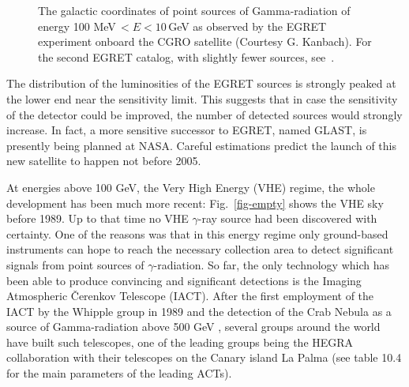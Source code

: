 \begin{figure}[h]
\begin{center}
\caption{\label{fig-egret3rdcat}
The galactic coordinates of point sources of Gamma-radiation of energy
100 MeV\,$< E < 10$\,GeV as observed by the EGRET experiment onboard the
CGRO satellite (Courtesy G. Kanbach). For the second EGRET catalog,
with slightly fewer sources, see~\protect\cite{thompson:95,thompson:96}.}
\end{center}
\end{figure}


The distribution of the luminosities of the EGRET sources is strongly peaked
at the lower end near the sensitivity limit. This suggests that in case the
sensitivity of the detector could be improved, the number of detected
sources would strongly increase. In fact, a more sensitive successor to
EGRET, named GLAST, is presently being planned at NASA. Careful estimations
predict the launch of this new satellite to happen not before 2005.

At energies above 100 GeV, the Very High Energy (VHE) regime, the whole
development has been much more recent: Fig.~\ref{fig-empty} 
shows the VHE sky before 1989. Up to that time no
VHE $\gamma$-ray source had been discovered with certainty. 
One of the reasons was that in this energy regime
only ground-based instruments can hope to reach the necessary collection area to 
detect significant signals from point sources of $\gamma$-radiation. 
So far, the only technology which has
been able to produce convincing and significant detections is the Imaging
Atmospheric \v{C}erenkov Telescope (IACT). After the first employment of the
IACT by the Whipple group in 1989 and the detection of the Crab Nebula as a
source of Gamma-radiation above 500 GeV \cite{weekes:89}, several groups
around the world have built such telescopes, one of the leading groups being
the HEGRA collaboration with their telescopes on the Canary island La Palma
(see table 10.4 for the main parameters of the leading ACTs).

